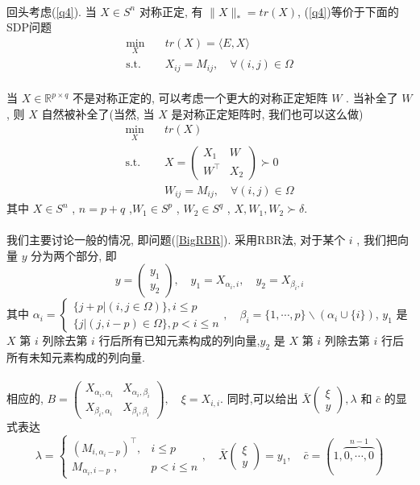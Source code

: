 \documentclass[UTF8]{ctexart}
\newcommand{\equSplit}[1]{\begin{equation}\begin{split}#1\end{split}\end{equation}}
\newcommand{\equ}[1]{\begin{equation}#1\end{equation}}
\newcommand{\Tst}{\text{s.t.}\quad}
\newcommand{\norm}[1]{\lVert#1\rVert}
\newcommand{\inprod}[1]{\langle#1\rangle}
\newcommand{\Real}[1]{\mathbb{R}^{#1}}
\newcommand{\nunorm}{\norm{X}_*}
\newcommand{\pMa}[1]{\begin{pmatrix}#1\end{pmatrix}}
\numberwithin{equation}{section}
\begin{document}
			\paragraph{}
				\quad 回头考虑(\ref{q4}). 当 $X \in S^n$ 对称正定, 有 $\nunorm = tr(X)$, (\ref{q4})等价于下面的SDP问题
				\equSplit{\label{RBR}
					\min_X \quad
						& tr(X) = \inprod{E, X}\\
					\Tst
						& X_{ij} = M_{ij}, \quad \forall(i, j) \in \Omega
				}

			\paragraph{}
				\quad 当 $X \in \Real{p \times q}$ 不是对称正定的, 可以考虑一个更大的对称正定矩阵 $W$ . 当补全了 $W$ , 则 $X$ 自然被补全了(当然, 当 $X$ 是对称正定矩阵时, 我们也可以这么做)
				\equSplit{\label{BigRBR}
					\min_X \quad
						& tr(X)\\
					\Tst
						& X = \pMa{X_1 & W \\ W^\top & X_2} \succ 0\\
						& W_{ij} = M_{ij}, \quad \forall(i, j) \in \Omega
				}
				其中 $X \in S^{n}$ , $n = p + q$ ,$W_1 \in S^p$ , $W_2 \in  S^q$ , $X, W_1, W_2 \succ \delta$.

			\paragraph{}
				\quad 我们主要讨论一般的情况, 即问题(\ref{BigRBR}). 采用RBR法, 对于某个 $i$ , 我们把向量 $y$ 分为两个部分, 即
				\equ{\label{BigRBRCondition1}
					y = \pMa{y_1 \\ y_2}, \quad
					y_1 = X_{\alpha_i, i}, \quad
					y_2 = X_{\beta_i, i}
				}
				其中
				$
					\alpha_i=
						\begin{cases}
							\{j + p \vert (i, j \in \Omega)\}, i \leq p\\
							\{j \vert (j, i - p) \in \Omega\}, p < i \leq n
						\end{cases}
						,\quad
					\beta_i = 
						\{1, \cdots, p\} \backslash (\alpha_i \cup \{i\})
				$,
				$y_1$ 是 $X$ 第 $i$ 列除去第 $i$ 行后所有已知元素构成的列向量,$y_2$ 是 $X$ 第 $i$ 列除去第 $i$ 行后所有未知元素构成的列向量.

			\paragraph{}
				\quad 相应的,
					$
						B =
							\pMa{X_{\alpha_i, \alpha_i} & X_{\alpha_i, \beta_i} \\ X_{\beta_i, \alpha_i} & X_{\beta_i, \beta_i}}
							,\quad 
						\xi =
							X_{i, i}
					$.
					同时,可以给出 $\bar{X} \pMa{\xi \\ y}, \lambda$ 和 $\bar{c}$ 的显式表达
			\equ{\label{BigRBRCondition2}
					\lambda
				= 	\begin{cases}
						(M_{i,\alpha_i-p})^\top,&i\leq p\\
						M_{\alpha_i,i-p}\;,&p<i\leq n
					\end{cases}
					, \quad
					\bar{X} \pMa{\xi\\y}
				=	y_1
					, \quad
					\bar{c}
				=	(1, \overbrace{0, \cdots, 0}^{n - 1})
			}
\end{document}
